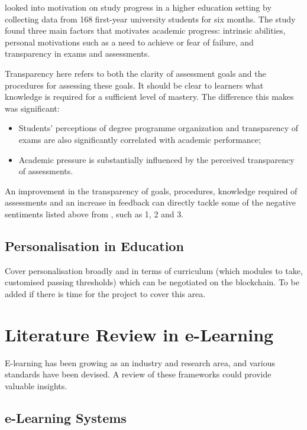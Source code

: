 \citet{suhre2013determinants} looked into motivation on study progress in a higher education setting by collecting data 
from 168 first-year university students for six months. The study found three main factors that motivates academic 
progress: intrinsic abilities, personal motivations such as a need to achieve or fear of failure, and transparency in 
exams and assessments.

Transparency here refers to both the clarity of assessment goals and the procedures for assessing these goals. 
It should be clear to learners what knowledge is required for a sufficient level of mastery. \citep{suhre2013determinants}
The difference this makes was significant:

\begin{itemize}
  \item Students' perceptions of degree programme organization and transparency of exams are also 
  significantly correlated with academic performance;
  \item Academic pressure is substantially influenced by the perceived transparency of assessments.
\end{itemize}

An improvement in the transparency of goals, procedures, knowledge required of assessments and an increase 
in feedback can directly tackle some of the negative sentiments listed above from \citet{brown1999assessment}, 
such as 1, 2 and 3.

\subsection{Personalisation in Education}

Cover personalisation broadly and in terms of curriculum (which modules to take, 
customised passing thresholds) which can be negotiated on the blockchain.
To be added if there is time for the project to cover this area.

\section{Literature Review in e-Learning}

E-learning has been growing as an industry and research area, and various standards have been devised. 
A review of these frameworks could provide valuable insights.

\subsection{e-Learning Systems}

